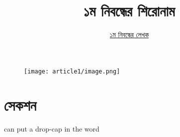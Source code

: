 \documentclass[12pt]{article}
\begin{document}
\begin{figure}[t]
        \centering 
        \texttt{[image: article1/image.png]}
\end{figure}

\title{১ম নিবন্ধের শিরোনাম}
\author{\href{https://github.com/rafisics/ebook-template}{১ম নিবন্ধের লেখক}}
\date{}


\section{সেকশন}

 can put a drop-cap in the word  
\lipsum



\end{document}
